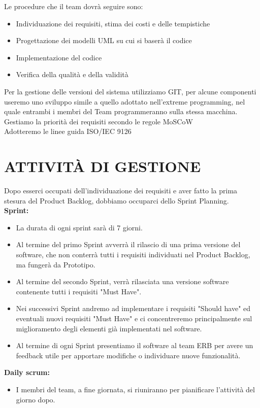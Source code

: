 \documentclass{report}
\begin{document}
Le procedure che il team dovrà seguire sono:
\begin{itemize}
\item Individuazione dei requisiti, stima dei costi e delle tempistiche
\item Progettazione dei modelli UML su cui si baserà il codice
\item Implementazione del codice
\item Verifica della qualità e della validità
\end{itemize}
Per la gestione delle versioni del sistema utilizziamo GIT, per alcune componenti useremo uno sviluppo simile a quello adottato nell'extreme programming, nel quale entrambi i membri del Team programmeranno sulla stessa macchina.\\
Gestiamo la priorità dei requisiti secondo le regole MoSCoW\\
Adotteremo le linee guida ISO/IEC 9126


\chapter{ATTIVITÀ DI GESTIONE}
Dopo esserci occupati dell'individuazione dei requisiti e aver fatto la prima stesura del Product Backlog, dobbiamo occuparci dello Sprint Planning.	\\
\textbf{Sprint:}\\
\begin{itemize}
\item La durata di ogni sprint sarà di 7 giorni.
\item Al termine del primo Sprint avverrà il rilascio di una prima versione del software, che non conterrà tutti i requisiti individuati nel Product Backlog, ma fungerà da Prototipo.
\item Al termine del secondo Sprint, verrà rilasciata una versione software contenente tutti i requisiti "Must Have".
\item Nei successivi Sprint andremo ad implementare i requisiti "Should have" ed eventuali nuovi requisiti "Must Have" e ci concentreremo principalmente sul miglioramento degli elementi già implementati nel software.
\item Al termine di ogni Sprint presentiamo il software al team ERB per avere un feedback utile per apportare modifiche o individuare nuove funzionalità.
\end{itemize}

\textbf{Daily scrum:}\\
\begin{itemize}
\item I membri del team, a fine giornata, si riuniranno per pianificare l'attività del giorno dopo.
\end{itemize}
\end{document}
